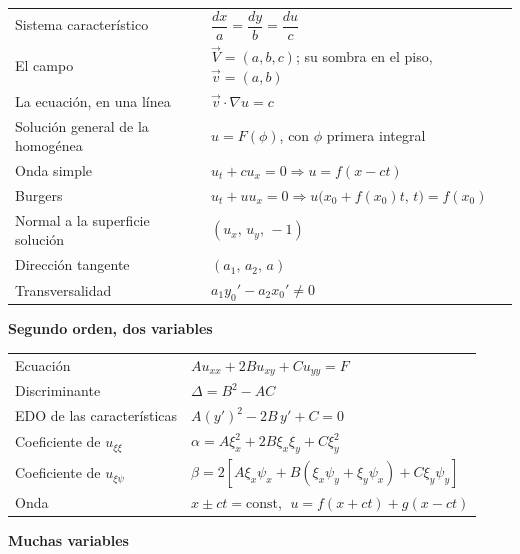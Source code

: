 \documentclass[
  spanish,
  a4paper,
]{scrbook}
\newcounter{none} %
\theoremstyle{definition}
\theoremstyle{plain}
\theoremstyle{definition}
\theoremstyle{plain}
\theoremstyle{definition}
\theoremstyle{remark}
\begin{document}
{\def\LTcaptype{none} %
\begin{longtable}[]{@{}
  >{\raggedright\arraybackslash}p{}
  >{\raggedright\arraybackslash}p{}@{}}
\toprule\noalign{}
\endhead
\bottomrule\noalign{}
\endlastfoot
Sistema característico &
\(\dfrac{dx}{a} = \dfrac{dy}{b} = \dfrac{du}{c}\) \\
El campo & \(\vec V = (a,b,c)\); su sombra en el piso,
\(\vec v = (a,b)\) \\
La ecuación, en una línea & \(\vec v\cdot\nabla u = c\) \\
Solución general de la homogénea & \(u = F(\phi)\), con \(\phi\) primera
integral \\
Onda simple & \(u_t + cu_x = 0 \Rightarrow u = f(x-ct)\) \\
Burgers &
\(u_t + uu_x = 0 \Rightarrow u\big(x_0+f(x_0)t,\,t\big) = f(x_0)\) \\
Normal a la superficie solución & \((u_x,\,u_y,\,-1)\) \\
Dirección tangente & \((a_1,\,a_2,\,a)\) \\
Transversalidad & \(a_1y_0' - a_2x_0' \neq 0\) \\
\end{longtable}
}

\textbf{Segundo orden, dos variables}

{\def\LTcaptype{none} %
\begin{longtable}[]{@{}
  >{\raggedright\arraybackslash}p{}
  >{\raggedright\arraybackslash}p{}@{}}
\toprule\noalign{}
\endhead
\bottomrule\noalign{}
\endlastfoot
Ecuación & \(A u_{xx} + 2B u_{xy} + C u_{yy} = F\) \\
Discriminante & \(\Delta = B^2 - AC\) \\
EDO de las características & \(A(y')^2 - 2B\,y' + C = 0\) \\
Coeficiente de \(u_{\xi\xi}\) &
\(\alpha = A\xi_x^2 + 2B\xi_x\xi_y + C\xi_y^2\) \\
Coeficiente de \(u_{\xi\psi}\) &
\(\beta = 2[A\xi_x\psi_x + B(\xi_x\psi_y+\xi_y\psi_x) + C\xi_y\psi_y]\) \\
Onda & \(x \pm ct = \text{const}\), \(\;u = f(x+ct)+g(x-ct)\) \\
\end{longtable}
}

\textbf{Muchas variables}
\end{document}
